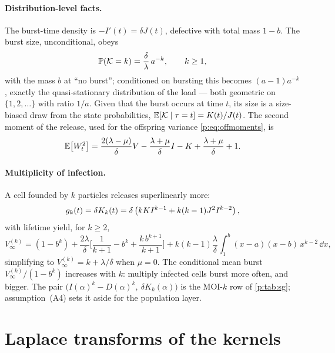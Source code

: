 \paragraph{Distribution-level facts.} The burst-time density is
$-I'(t)=\delta J(t)$, defective with total mass $1-b$. The burst size,
unconditional, obeys
\begin{equation}
\mathbb{P}\!\left(\mathcal{K}=k\right)=\frac{\delta}{\lambda}\,a^{-k},\qquad k\ge1,
\label{p:eq:burstlaw}
\end{equation}
with the mass $b$ at ``no burst''; conditioned on bursting this becomes
$(a-1)a^{-k}$, exactly the quasi-stationary distribution of the load
\cite{van2011quasi} --- both geometric on $\{1,2,\ldots\}$ with ratio $1/a$.
Given that the burst occurs at time $t$, its size is a size-biased draw from
the state probabilities, $\mathbb{E}\!\left[\mathcal{K}\mid\tau=t\right]=K(t)/J(t)$. The second moment
of the release, used for the offspring variance \cref{p:eq:offmoments}, is
\begin{equation}
\mathbb{E}\!\left[W_t^2\right]
=\frac{2(\lambda-\mu)}{\delta}V-\frac{\lambda+\mu}{\delta}I-K
+\frac{\lambda+\mu}{\delta}+1.
\label{p:eq:EW2}
\end{equation}

\paragraph{Multiplicity of infection.} A cell founded by $k$ particles
releases superlinearly more:
\begin{equation}
g_k(t)=\delta K_k(t)
=\delta\left(kK I^{k-1}+k(k-1)J^2I^{k-2}\right),
\label{p:eq:gk}
\end{equation}
with lifetime yield, for $k\ge2$,
\begin{equation}
V_\infty^{(k)}
=(1-b^k)
+\frac{2\lambda}{\delta}\Biggl[\frac{1}{k+1}-b^k+\frac{k\,b^{k+1}}{k+1}\Biggr]
+k(k-1)\frac{\lambda}{\delta}\int_1^b (x-a)(x-b)\,x^{k-2}\,\dd x,
\label{p:eq:Vk}
\end{equation}
simplifying to $V_\infty^{(k)}=k+\lambda/\delta$ when $\mu=0$. The
conditional mean burst $V_\infty^{(k)}/(1-b^k)$ increases with $k$: multiply
infected cells burst more often, and bigger. The pair
$\bigl(I(\alpha)^k-D(\alpha)^k,\ \delta K_k(\alpha)\bigr)$ is the MOI-$k$
row of \cref{p:tab:sg}; assumption~(A4) sets it aside for the population
layer.

\section{Laplace transforms of the kernels}
\label{p:app:transforms}

